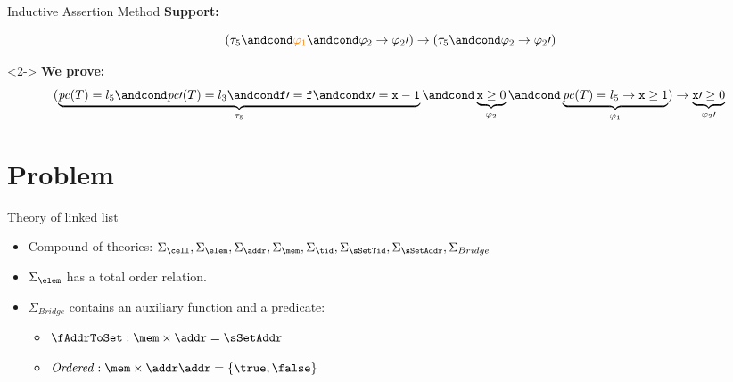 \documentclass[10pt,notes,compress,usetitleprogressbar,aspectratio=1610]{beamer}
\newcommand{\pc}{\ensuremath{\mathit{pc}}\xspace}
\begin{document}
\begin{frame}{Inductive Assertion Method}
	\textbf{Support:}


	\[
		(\tau_5 \andcond \textcolor{orange}{\varphi_1} \andcond \varphi_2 \to \varphi_2\prime ) \rightarrow ( \tau_5 \andcond \varphi_2\to\varphi_2\prime )
	\]

	\begin{block}<2->{}
	\vspace{-1cm}
		\textbf{We prove:}
		\begin{equation*}
			(
				\underbrace{\pc(T) = l_5 \andcond \pc\prime (T) = l_3 \andcond \mathtt{f\prime =f} \andcond \mathtt{x\prime =x-1}}_{\tau_5} \andcond \underbrace{\mathtt{x} \geq 0}_{\varphi_2} \andcond \underbrace{\pc(T) = l_5 \to \mathtt{x} \geq 1}_{\varphi_1}
			) 
				\to \underbrace{\mathtt{x}\prime  \geq 0}_{\varphi_2\prime }\\\\
		\end{equation*}
	\end{block}



\end{frame}


\section{Problem}
\begin{frame}{Theory of linked list}

\begin{itemize}
	\item Compound of theories: $\displaystyle\Sigma_{\cell},\displaystyle\Sigma_{\elem},\displaystyle\Sigma_{\addr},\displaystyle\Sigma_{\mem},\displaystyle\Sigma_{\tid},\displaystyle\Sigma_{\sSetTid},\displaystyle\Sigma_{\sSetAddr},\displaystyle\Sigma_{Bridge}$
	\item $\displaystyle\Sigma_{\elem}$ has a total order relation.
	\item $\displaystyle\Sigma_{Bridge}$ contains an auxiliary function and a predicate:
	\begin{itemize}
		\item $\fAddrToSet : \mem \times \addr = \sSetAddr$
		\item $\mathit{Ordered} : \mem\times\addr\addr = \{\true,\false\}$
	\end{itemize}
\end{itemize}

\end{frame}
\end{document}

